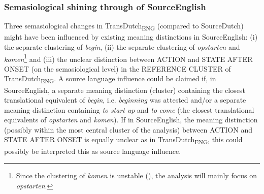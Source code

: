 \subsubsection{Semasiological shining through of SourceEnglish}
\label{sec:4.6.1.1}  
Three semasiological changes in TransDutch\textsubscript{ENG} (compared to SourceDutch) might have been influenced by existing meaning distinctions in SourceEnglish: (i) the separate clustering of \textit{begin}, (ii) the separate clustering of \textit{opstarten} and \textit{komen}\footnote{Since the clustering of \textit{komen} is unstable (), the analysis will mainly focus on \textit{opstarten}.} and (iii) the unclear distinction between ACTION and STATE AFTER ONSET (on the semasiological level) in the REFERENCE CLUSTER of TransDutch\textsubscript{ENG}. A source language influence could be claimed if, in SourceEnglish, a separate meaning distinction (cluster) containing the closest translational equivalent of \textit{begin}, i.e. \textit{beginning} was attested and/or a separate meaning distinction containing \textit{to} \textit{start} \textit{up} and \textit{to} \textit{come} (the closest translational equivalents of \textit{opstarten} and \textit{komen}). If in SourceEnglish, the meaning distinction (possibly within the most central cluster of the analysis) between ACTION and STATE AFTER ONSET is equally unclear as in TransDutch\textsubscript{ENG}, this could possibly be interpreted this as source language influence.

